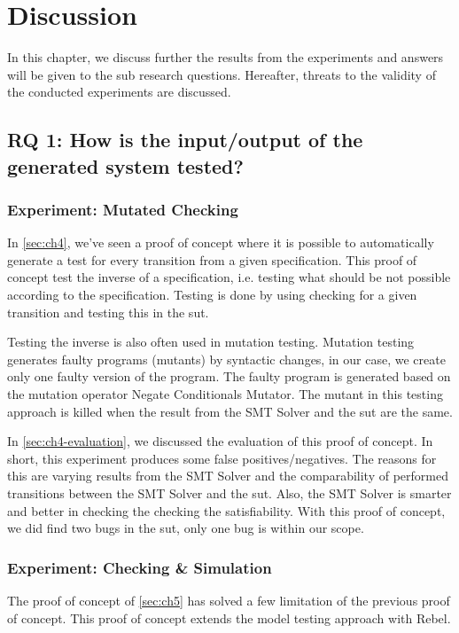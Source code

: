 \chapter{Discussion}

In this chapter, we discuss further the results from the experiments and answers will be given to the sub research questions. Hereafter, threats to the validity of the conducted experiments are discussed.

\section{RQ 1: How is the input/output of the generated system tested?}

\subsection{Experiment: Mutated Checking}
In \autoref{sec:ch4}, we've seen a proof of concept where it is possible to automatically generate a test for every transition from a given specification. This proof of concept test the inverse of a specification, i.e. testing what should be not possible according to the specification. Testing is done by using checking for a given transition and testing this in the \gls{sut}.

Testing the inverse is also often used in mutation testing. Mutation testing generates faulty programs (mutants) by syntactic changes, in our case, we create only one faulty version of the program. The faulty program is generated based on the mutation operator Negate Conditionals Mutator. The mutant in this testing approach is killed when the result from the SMT Solver and the \gls{sut} are the same.

In \autoref{sec:ch4-evaluation}, we discussed the evaluation of this proof of concept. In short, this experiment produces some false positives/negatives. The reasons for this are varying results from the SMT Solver and the comparability of performed transitions between the SMT Solver and the \gls{sut}. Also, the SMT Solver is smarter and better in checking the checking the satisfiability. With this proof of concept, we did find two bugs in the \gls{sut}, only one bug is within our scope.


\subsection{Experiment: Checking & Simulation}
The proof of concept of \autoref{sec:ch5} has solved a few limitation of the previous proof of concept. This proof of concept extends the model testing approach with Rebel.

